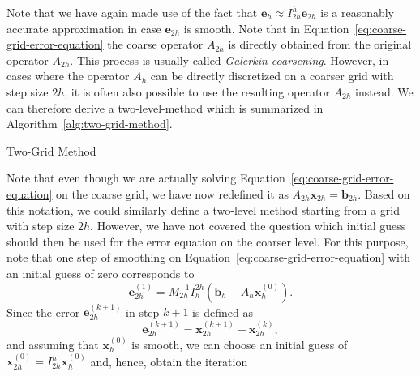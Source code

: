 Note that we have again made use of the fact that $\bm{e}_{h} \approx I_{2h}^{h} \bm{e}_{2h}$ is a reasonably accurate approximation in case $\bm{e}_{2h}$ is smooth.
Note that in Equation~\eqref{eq:coarse-grid-error-equation} the coarse operator $A_{2h}$ is directly obtained from the original operator $A_{2h}$. 
This process is usually called \emph{Galerkin coarsening}.
However, in cases where the operator $A_h$ can be directly discretized on a coarser grid with step size $2h$, it is often also possible to use the resulting operator $A_{2h}$ instead.
We can therefore derive a two-level-method which is summarized in Algorithm~\ref{alg:two-grid-method}.
\begin{algorithm}
	\caption{Two-Grid Method}
	\label{alg:two-grid-method}
	\begin{algorithmic}
	\end{algorithmic}
\end{algorithm}
Note that even though we are actually solving Equation~\eqref{eq:coarse-grid-error-equation} on the coarse grid, we have now redefined it as $A_{2h} \bm{x}_{2h} = \bm{b}_{2h}$.
Based on this notation, we could similarly define a two-level method starting from a grid with step size $2h$.
However, we have not covered the question which initial guess should then be used for the error equation on the coarser level.
For this purpose, note that one step of smoothing on Equation~\eqref{eq:coarse-grid-error-equation} with an initial guess of zero corresponds to
\begin{equation}
	\bm{e}_{2h}^{(1)} = M_{2h}^{-1} I_{h}^{2h} \left(\bm{b}_h - A_h \bm{x}^{(0)}_h\right).
	\label{eq:initial-coarse-grid-relaxation}
\end{equation}
Since the error $\bm{e}_{2h}^{(k+1)}$ in step $k+1$ is defined as
\begin{equation*}
	\bm{e}_{2h}^{(k+1)} = \bm{x}_{2h}^{(k+1)} - \bm{x}_{2h}^{(k)},
\end{equation*}
and assuming that $\bm{x}_{h}^{(0)}$ is smooth, we can choose an initial guess of $\bm{x}_{2h}^{(0)} = I_{2h}^{h} \bm{x}_{h}^{(0)}$ and, hence, obtain the iteration
